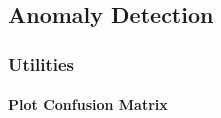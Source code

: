\documentclass[11pt]{article}
\begin{document}
    \hypertarget{anomaly-detection}{%
\subsection{Anomaly Detection}\label{anomaly-detection}}

    \hypertarget{utilities}{%
\subsubsection{Utilities}\label{utilities}}

    \hypertarget{plot-confusion-matrix}{%
\paragraph{Plot Confusion Matrix}\label{plot-confusion-matrix}}
\end{document}
